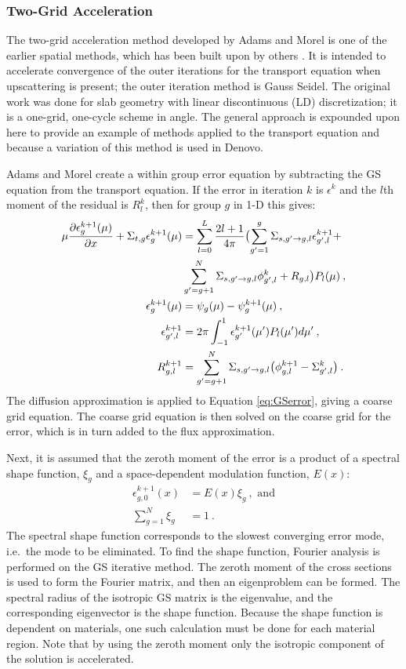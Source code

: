 \subsubsection{Two-Grid Acceleration}
The two-grid acceleration method developed by Adams and Morel is one of the earlier spatial \mg methods, which has been built upon by others \cite{Adams1993}. It is intended to accelerate convergence of the outer iterations for the transport equation when upscattering is present; the outer iteration method is Gauss Seidel. The original work was done for slab geometry with linear discontinuous (LD) discretization; it is a one-grid, one-cycle scheme in angle. The general approach is expounded upon here to provide an example of \mg methods applied to the transport equation and because a variation of this method is used in Denovo. 

Adams and Morel create a within group error equation by subtracting the GS equation from the transport equation. If the error in iteration $k$ is $\epsilon^k$ and the $l$th moment of the residual is $R_l^k$, then for group $g$ in 1-D this gives:
%
\begin{align}
   \mu \frac{\partial \epsilon_{g}^{k+1}(\mu)}{\partial x} + \Sigma_{t,g} \epsilon_{g}^{k+1}(\mu) &= \sum_{l=0}^{L}\frac{2l+1}{4\pi} \bigl( \sum_{g'=1}^{g}\Sigma_{s,g' \to g, l} \epsilon_{g',l}^{k+1} 
   +  \label{eq:GSerror} \\
   &\sum_{g'=g+1}^{N}\Sigma_{s,g' \to g, l} \phi_{g',l}^{k} + R_{g,l}\bigr) P_{l}(\mu) \:, \nonumber \\
  \epsilon_{g}^{k+1}(\mu) &= \psi_{g}(\mu) - \psi_{g}^{k+1}(\mu) \:, \\
  \epsilon_{g',l}^{k+1} &= 2\pi \int_{-1}^{1}\epsilon_{g'}^{k+1}(\mu') P_{l}(\mu') d\mu' \:, \\ 
  R_{g,l}^{k+1} &=  \sum_{g'=g+1}^{N}\Sigma_{s,g' \to g, l} \bigl( \phi_{g,l}^{k+1} - \Sigma_{g',l}^{k} \bigr) \:.
\end{align}
%
The diffusion approximation is applied to Equation \eqref{eq:GSerror}, giving a coarse grid equation. The coarse grid equation is then solved on the coarse grid for the error, which is in turn added to the flux approximation. 

Next, it is assumed that the zeroth moment of the error is a product of a spectral shape function, $\xi_g$ and a space-dependent modulation function, $E(x)$:
%
\begin{align}
  \epsilon_{g,0}^{k+1}(x) &= E(x)\xi_{g} \:, \text{ and} \label{eq:errorExpand} \\
  \sum_{g=1}^{N} \xi_{g} &= 1 \:.
\end{align} 
%
The spectral shape function corresponds to the slowest converging error mode, i.e.\ the mode to be eliminated. To find the shape function, Fourier analysis is performed on the GS iterative method. The zeroth moment of the cross sections is used to form the Fourier matrix, and then an eigenproblem can be formed. The spectral radius of the isotropic GS matrix is the eigenvalue, and the corresponding eigenvector is the shape function. Because the shape function is dependent on materials, one such calculation must be done for each material region. Note that by using the zeroth moment only the isotropic component of the solution is accelerated.

